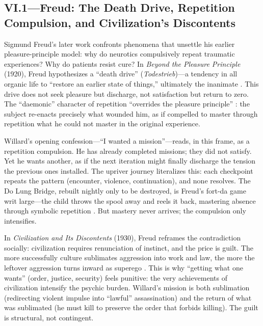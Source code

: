 \subsection*{VI.1—Freud: The Death Drive, Repetition Compulsion, and Civilization's Discontents}
\label{ssec:vi-freud}

Sigmund Freud's later work confronts phenomena that unsettle his earlier pleasure-principle
model: why do neurotics compulsively repeat traumatic experiences? Why do patients resist cure?
In \textit{Beyond the Pleasure Principle} (1920), Freud hypothesizes a ``death drive''
(\emph{Todestrieb})---a tendency in all organic life to ``restore an earlier state of things,''
ultimately the inanimate \parencite[p.~38]{FreudBeyond1955}. This drive does not seek pleasure
but discharge, not satisfaction but return to zero. The ``daemonic'' character of repetition
``overrides the pleasure principle'' \parencite[p.~22]{FreudBeyond1955}: the subject
re-enacts precisely what wounded him, as if compelled to master through repetition what he
could not master in the original experience.

Willard's opening confession---``I wanted a mission''---reads, in this frame, as a repetition
compulsion. He has already completed missions; they did not satisfy. Yet he wants another, as
if the next iteration might finally discharge the tension the previous ones installed. The
upriver journey literalizes this: each checkpoint repeats the pattern (encounter, violence,
continuation), and none resolves. The Do Lung Bridge, rebuilt nightly only to be destroyed, is
Freud's fort-da game writ large---the child throws the spool away and reels it back, mastering
absence through symbolic repetition \parencite[pp.~14--16]{FreudBeyond1955}. But mastery never
arrives; the compulsion only intensifies.

In \textit{Civilization and Its Discontents} (1930), Freud reframes the contradiction
socially: civilization requires renunciation of instinct, and the price is guilt. The more
successfully culture sublimates aggression into work and law, the more the leftover aggression
turns inward as superego \parencite[pp.~70--97]{FreudCivilization1961}. This is why ``getting
what one wants'' (order, justice, security) feels punitive: the very achievements of
civilization intensify the psychic burden. Willard's mission is both sublimation (redirecting
violent impulse into ``lawful'' assassination) and the return of what was sublimated (he must
kill to preserve the order that forbids killing). The guilt is structural, not contingent.


